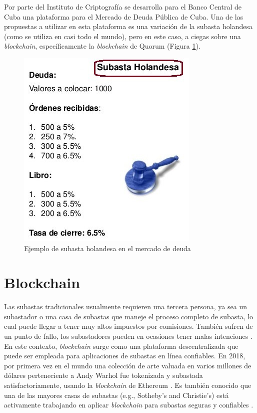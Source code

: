     Por parte del Instituto de Criptografía se desarrolla para el Banco Central de Cuba una plataforma para el Mercado de Deuda Pública de 
    Cuba. Una de las propuestas a utilizar en esta plataforma es una variación de la subasta holandesa (como se utiliza en casi todo el 
    mundo), pero en este caso, a ciegas sobre una \textit{blockchain}, específicamente la \textit{blockchain} de Quorum (Figura 
    \ref{dutch_auction}).

    \begin{figure}[H]
      \center
      \includegraphics[scale=0.7]{Graphics/subasta-holandesa1.jpg}
      \caption{Ejemplo de subasta holandesa en el mercado de deuda}
      \label{dutch_auction}
    \end{figure}

\section{Blockchain} %
  Las subastas tradicionales usualmente requieren una tercera persona, ya sea un subastador o una 
  casa de subastas que maneje el proceso completo de subasta, lo cual puede llegar a tener muy altos
  impuestos por comisiones. También sufren de un punto de fallo, los subastadores pueden en ocasiones 
  tener malas intenciones \parencite{wu2019}. En este contexto, \textit{blockchain} surge como una plataforma descentralizada que
  puede ser empleada para aplicaciones de subastas en línea confiables. En 2018, por primera vez en el 
  mundo una colección de arte valuada en varios millones de dólares perteneciente a Andy Warhol fue tokenizada
  y subastada satisfactoriamente, usando la \textit{blockchain} de Ethereum \parencite{wood2021,emem}. Es también
  conocido que una de las mayores casas de subastas (e.g., Sotheby’s and Christie’s) está activamente
  trabajando en aplicar \textit{blockchain} para subastas seguras y confiables \parencite{neuendorf2018}. 


